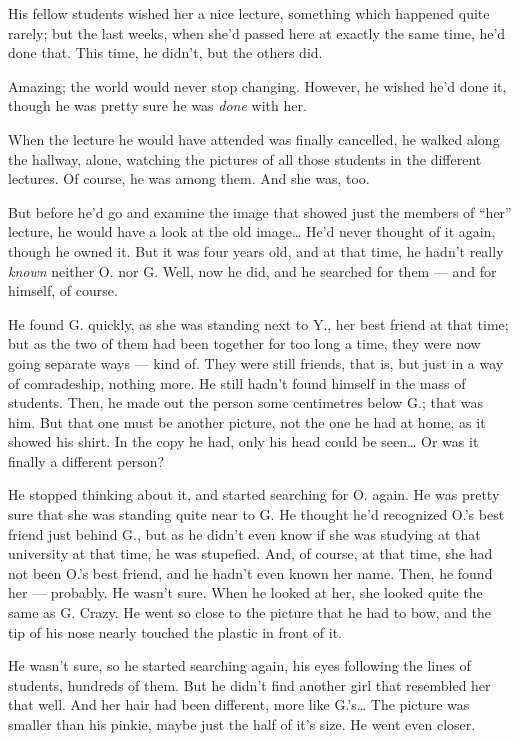 His fellow students wished her a nice lecture, something which happened quite rarely; but the last weeks, when she'd passed here at exactly the same time, he'd done that. 
This time, he didn't, but the others did.

Amazing; the world would never stop changing. 
However, he wished he'd done it, though he was pretty sure he was \emph{done} with her. 

When the lecture he would have attended was finally cancelled, he walked along the hallway, alone, watching the pictures of all those students in the different lectures. 
Of course, he was among them. 
And she was, too. 

But before he'd go and examine the image that showed just the members of \enquote{her} lecture, he would have a look at the old image\dots{}
He'd never thought of it again, though he owned it. 
But it was four years old, and at that time, he hadn't really \emph{known} neither O. nor G. 
Well, now he did, and he searched for them --- and for himself, of course.

He found G. quickly, as she was standing next to Y., her best friend at that time; but as the two of them had been together for too long a time, they were now going separate ways --- kind of. They were still friends, that is, but just in a way of comradeship, nothing more. 
He still hadn't found himself in the mass of students. 
Then, he made out the person some centimetres below G.; that was him. 
But that one must be another picture, not the one he had at home, as it showed his shirt. In the copy he had, only his head could be seen\dots{}
Or was it finally a different person?

He stopped thinking about it, and started searching for O. again. He was pretty sure that she was standing quite near to G. He thought he'd recognized O.'s best friend just behind G., but as he didn't even know if she was studying at that university at that time, he was stupefied. And, of course, at that time, she had not been O.'s best friend, and he hadn't even known her name. 
Then, he found her --- probably. He wasn't sure. When he looked at her, she looked quite the same as G. Crazy. He went so close to the picture that he had to bow, and the tip of his nose nearly touched the plastic in front of it.

He wasn't sure, so he started searching again, his eyes following the lines of students, hundreds of them. 
But he didn't find another girl that resembled her that well. And her hair had been different, more like G.'s\dots{}
The picture was smaller than his pinkie, maybe just the half of it's size. 
He went even closer.

